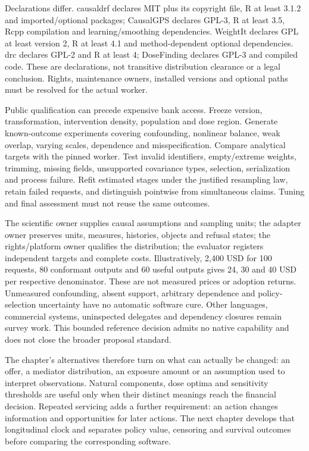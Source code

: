 Declarations differ. causaldrf declares MIT plus its copyright file, R at least
3.1.2 and imported/optional packages; CausalGPS declares GPL-3, R at least 3.5,
Rcpp compilation and learning/smoothing dependencies. WeightIt declares GPL
at least version 2, R at least 4.1 and method-dependent optional dependencies.
drc declares GPL-2 and R at least 4; DoseFinding declares GPL-3 and compiled
code. These are declarations, not transitive distribution clearance or a legal
conclusion. Rights, maintenance owners, installed versions and optional paths
must be resolved for the actual worker.
\citep{exec24_dose_causaldrf,exec24_dose_causalgps,exec24_dose_weightit,exec24_dose_drc,exec24_dose_dosefinding}

Public qualification can precede expensive bank access. Freeze version,
transformation, intervention density, population and dose region. Generate
known-outcome experiments covering confounding, nonlinear balance, weak overlap,
varying scales, dependence and misspecification. Compare analytical targets with
the pinned worker. Test invalid identifiers, empty/extreme weights, trimming,
missing fields, unsupported covariance types, selection, serialization and
process failure. Refit estimated stages under the justified resampling law,
retain failed requests, and distinguish pointwise from simultaneous claims.
Tuning and final assessment must not reuse the same outcomes.
\citep{exec24_dose_contract}

The scientific owner supplies causal assumptions and sampling units; the
adapter owner preserves units, measures, histories, objects and refusal states;
the rights/platform owner qualifies the distribution; the evaluator registers
independent targets and complete costs. Illustratively, 2,400 USD for 100
requests, 80 conformant outputs and 60 useful outputs gives 24, 30 and 40 USD
per respective denominator. These are not measured prices or adoption returns.
Unmeasured confounding, absent support, arbitrary dependence and policy-selection
uncertainty have no automatic software cure. Other languages, commercial
systems, uninspected delegates and dependency closures remain survey work.
This bounded reference decision admits no native capability and does not close
the broader proposal standard.~\citep{exec24_dose_contract}


The chapter's alternatives therefore turn on what can actually be changed:
an offer, a mediator distribution, an exposure amount or an assumption used
to interpret observations. Natural components, dose optima and sensitivity
thresholds are useful only when their distinct meanings reach the financial
decision. Repeated servicing adds a further requirement: an action changes
information and opportunities for later actions. The next chapter develops
that longitudinal clock and separates policy value, censoring and survival
outcomes before comparing the corresponding software.
